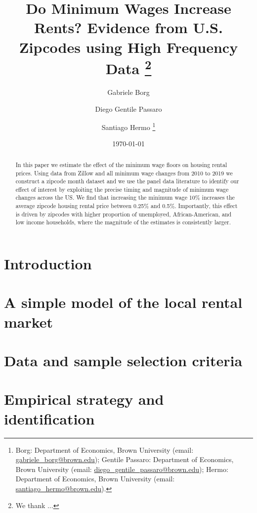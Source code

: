 \documentclass{article}
\title{Do Minimum Wages Increase Rents? 
	   Evidence from U.S. Zipcodes using High Frequency Data \thanks{We thank ...}}
\author{Gabriele Borg \and Diego Gentile Passaro \and Santiago Hermo
		\footnote{Borg: Department of Economics, Brown University (email: 
		\url{gabriele_borg@brown.edu}); 
		Gentile Passaro: Department of Economics, Brown University (email: 
		\url{diego_gentile_passaro@brown.edu}); 
		Hermo: Department of Economics, Brown University (email: 
		\url{santiago_hermo@brown.edu}).}
		}
\date{\today}
\begin{document}
\maketitle

\begin{abstract}
    \noindent In this paper we estimate the effect of the minimum wage floors on 
    housing rental prices. Using data from Zillow and all minimum wage changes from 
    2010 to 2019 we construct a zipcode month dataset and we use the panel data literature 
    to identify our effect of interest by exploiting the precise timing and magnitude of 
    minimum wage changes across the US. We find that increasing the minimum wage 10\% 
    increases the average zipcode housing rental price between 0.25\% and 0.5\%. Importantly,
    this effect is driven by zipcodes with higher proportion of unemployed, African-American, 
    and low income households, where the magnitude of the estimates is consistently larger.
\end{abstract}

\vspace{5mm}

\maketitle
\onehalfspacing

\clearpage

\section{Introduction}\label{sec:intro}
    

\section{A simple model of the local rental market}\label{sec:model}
    

\section{Data and sample selection criteria}\label{sec:data}
	

\section{Empirical strategy and identification}\label{sec:empirical_strategy}
    
\end{document}
